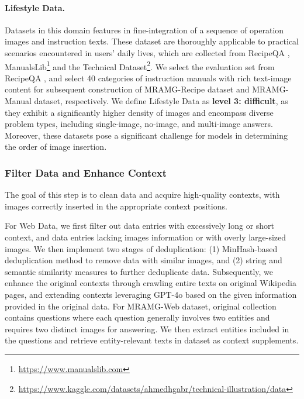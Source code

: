 \paragraph{Lifestyle Data.} Datasets in this domain features in fine-integration of a sequence of operation images and instruction texts. These dataset are thoroughly applicable to practical scenarios encountered in users' daily lives, which are collected from RecipeQA \citep{yagcioglu2018recipeqa}, 
ManualsLib\footnote{\url{https://www.manualslib.com}}
and the Technical Dataset\footnote{\url{https://www.kaggle.com/datasets/ahmedhgabr/technical-illustration/data}}.
We select the evaluation set from RecipeQA \citep{yagcioglu2018recipeqa}, and select 40 categories of instruction manuals with rich text-image content for subsequent construction of MRAMG-Recipe dataset and MRAMG-Manual dataset, respectively. We define Lifestyle Data as \textbf{level 3: difficult}, as they exhibit a significantly higher density of images and encompass diverse problem types, including single-image, no-image, and multi-image answers. 
Moreover, these datasets pose a significant challenge for models in determining the order of image insertion.
\subsubsection{Filter Data and Enhance Context}
The goal of this step is to clean data and acquire high-quality contexts, with images correctly inserted in the appropriate context positions.

For Web Data, we first filter out data entries with excessively long or short context, and data entries lacking images information or with overly large-sized images. We then implement two stages of deduplication: (1) MinHash-based deduplication \citep{shrivastava2014defense} method to remove data with similar images, and (2) string and semantic similarity measures \citep{TF-IDF,BGE} to further deduplicate data. Subsequently, we enhance the original contexts through crawling entire texts on original Wikipedia pages, and extending contexts leveraging GPT-4o based on the given information provided in the original data. For MRAMG-Web dataset, original collection contains questions where each question generally involves two entities and requires two distinct images for answering. We then extract entities included in the questions and retrieve entity-relevant texts in dataset as context supplements.

